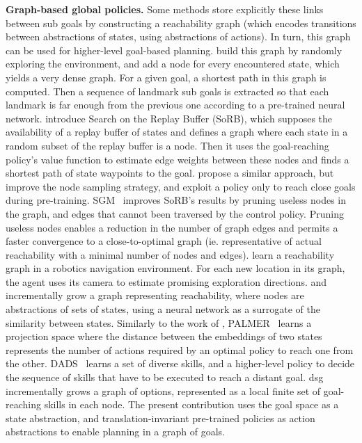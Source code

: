 

\textbf{Graph-based global policies.}
Some methods store explicitly these links between sub goals by constructing a reachability graph (which encodes
transitions between abstractions of states, using abstractions of actions).
In turn, this graph can be used for higher-level goal-based planning.
\citet{savinov2018semi} build this graph by randomly exploring the environment, and add a node for every encountered
state, which yields a very dense graph.
For a given goal, a shortest path in this graph is computed.
Then a sequence of landmark sub goals is extracted so that each landmark is far enough from the previous one according
to a pre-trained neural network.
\citet{eysenbach2019search} introduce Search on the Replay Buffer (SoRB), which supposes the availability of a replay
buffer of states and defines a graph where each state in a random subset of the replay buffer is a node.
Then it uses the goal-reaching policy's value function to estimate edge weights between these nodes and finds a shortest
path of state waypoints to the goal.
\citet{huang2019mapping} propose a similar approach, but improve the node sampling strategy, and exploit a policy only
to reach close goals during pre-training.
SGM~\citep{emmons2020sparse} improves SoRB's results by pruning useless nodes in the graph, and edges that cannot been
traversed by the control policy.
Pruning useless nodes enables a reduction in the number of graph edges and permits a faster convergence to a
close-to-optimal graph (ie. representative of actual reachability with a minimal number of nodes and edges).
\citet{chaplot2020neural} learn a reachability graph in a robotics navigation environment.
For each new location in its graph, the agent uses its camera to estimate promising exploration directions.
\citet{aubret2021distop} and \citet{ruan2022target} incrementally grow a graph representing reachability, where nodes
are abstractions of sets of states, using a neural network as a surrogate of the similarity between states.
Similarly to the work of \citet{aubret2021distop}, PALMER~\citep{beker2022palmer} learns a projection space where the
distance between the embeddings of two states
represents the number of actions required by an optimal policy to reach one from the other.
DADS~\citep{sharma2019dynamics} learns a set of diverse skills, and a higher-level policy to decide the sequence of
skills that have to be executed to reach a distant goal.
\acrshort{dsg}~\citep{bagaria2021skill} incrementally grows a graph of options, represented as a local finite set of
goal-reaching skills in each node.
The present contribution uses the goal space as a state abstraction, and translation-invariant pre-trained policies as
action abstractions to enable planning in a graph of goals.

